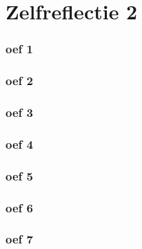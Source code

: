 \documentclass[lineaire_algebra_oplossingen.tex]{subfiles}
\begin{document}
\part{Zelfreflectie 2}
\section{oef 1}
\section{oef 2}
\section{oef 3}
\section{oef 4}
\section{oef 5}
\section{oef 6}
\section{oef 7}
\end{document}
